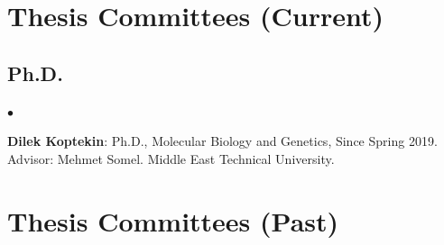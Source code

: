 \documentclass[margin,line]{res}
\newenvironment{list2}{
  \begin{list}{$\bullet$}{%
      \setlength{\itemsep}{0.1cm}
      \setlength{\parsep}{0in} \setlength{\parskip}{0in}
      \setlength{\topsep}{0in} \setlength{\partopsep}{0in} 
      \setlength{\leftmargin}{0.2in}}}{\end{list}}
\begin{document}
\begin{resume}
\section{\sc Thesis Committees (Current)}

\vspace*{-.4cm}
\subsection{\small \sc Ph.D.}
\begin{list2}
\item
{\bf Dilek Koptekin}: Ph.D., Molecular Biology and Genetics, Since Spring 2019.
Advisor: Mehmet Somel. Middle East Technical University.
\end{list2}

\section{\sc Thesis Committees (Past)}

\vspace*{-.4cm}

\end{resume}
\end{document}
